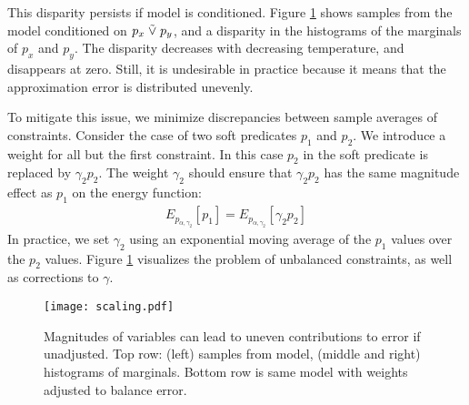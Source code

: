 This disparity persists if model is conditioned.
Figure \ref{scaling} shows samples from the model conditioned on $p_x \mathrel{\tilde{\lor}} p_y$, and a disparity in the histograms of the marginals of $p_x$ and $p_y$.
The disparity decreases with decreasing temperature, and disappears at zero.
Still, it is undesirable in practice because it means that the approximation error is distributed unevenly.

To mitigate this issue, we minimize discrepancies between sample averages of constraints.
Consider the case of two 
soft predicates $p_1$ and $p_2$. We introduce a weight for all but the first constraint.
In this case $p_2$ in the soft predicate is replaced
by $\gamma_2 p_2$. The weight $\gamma_2$ should
ensure that $\gamma_2 p_2$ has the same
magnitude effect as $p_1$ on the energy
function:
\begin{align*}
E_{p_{\alpha, \gamma_2}}[p_1] = E_{p_{\alpha, \gamma_2}}[\gamma_2 p_2] 
\end{align*}
In practice, we set $\gamma_2$ using an exponential moving
average of the $p_1$ values over the $p_2$ values.
Figure \ref{scaling} visualizes the problem of unbalanced constraints, as well as corrections to $\gamma$.


\begin{figure}
  \centering
  \texttt{[image: scaling.pdf]}
  \caption{Magnitudes of variables can lead to uneven contributions to error if unadjusted.  Top row: (left) samples from model, (middle and right) histograms of marginals.  Bottom row is same model with weights adjusted to balance error.}\label{scaling}
  \end{figure}

  
